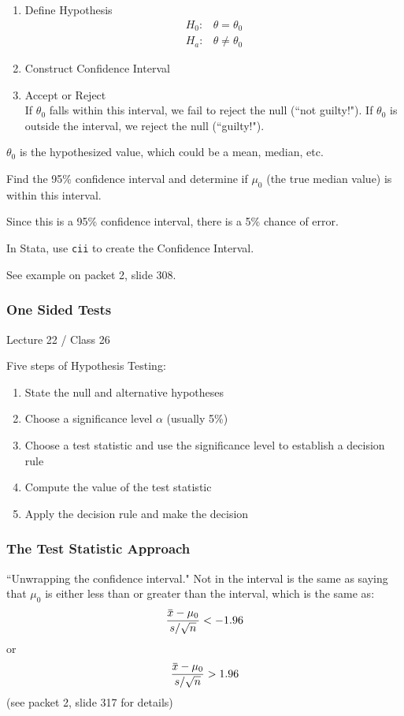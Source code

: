 \documentclass[11pt, oneside]{article}   	%
\newcommand{\overbar}[1]{\mkern 1.5mu\overline{\mkern-1.5mu#1\mkern-1.5mu}\mkern 1.5mu}
\begin{document}
\begin{enumerate}
\item{Define Hypothesis}
\begin{align*}
H_0 :& \theta = \theta_0 \\
H_a :& \theta \neq \theta_0
\end{align*}
\item{Construct Confidence Interval}
\item{Accept or Reject}\\
If $\theta_0$ falls within this interval, we fail to reject the null (``not guilty!"). If $\theta_0$ is outside the interval, we reject the null (``guilty!").
\end{enumerate}

$\theta_0$ is the hypothesized value, which could be a mean, median, etc.

Find the 95\% confidence interval and determine if $\mu_0$ (the true median value) is within this interval.

Since this is a 95\% confidence interval, there is a 5\% chance of error.

In Stata, use \texttt{cii} to create the Confidence Interval.

See example on packet 2, slide 308.

\subsubsection{One Sided Tests}

Lecture 22 / Class 26

Five steps of Hypothesis Testing:
\begin{enumerate}
\item{State the null and alternative hypotheses}
\item{Choose a significance level $\alpha$ (usually 5\%)}
\item{Choose a test statistic and use the significance level to establish a decision rule}
\item{ Compute the value of the test statistic }
\item{ Apply the decision rule and make the decision }
\end{enumerate}

\subsubsection{The Test Statistic Approach}

``Unwrapping the confidence interval." Not in the interval is the same as saying that $\mu_0$ is either less than or greater than the interval, which is the same as:
\[
\frac{\overbar{x} - \mu_0}{s / \sqrt{n}} < -1.96
\]
or
\[
\frac{\overbar{x} - \mu_0}{s / \sqrt{n}} > 1.96
\]
(see packet 2, slide 317 for details)
\end{document}

